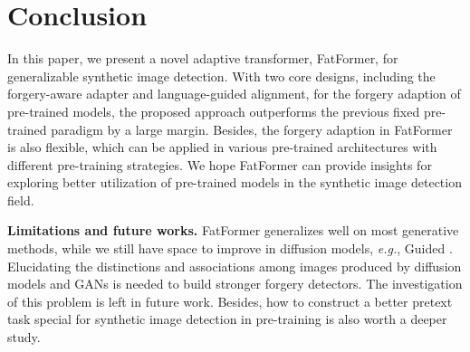 \documentclass[10pt,twocolumn,letterpaper]{article}
\begin{document}
\section{Conclusion}
In this paper, we present a novel adaptive transformer, FatFormer, for generalizable synthetic image detection. With two core designs, including the forgery-aware adapter and language-guided alignment, for the forgery adaption of pre-trained models, the proposed approach outperforms the previous fixed pre-trained paradigm by a large margin. Besides, the forgery adaption in FatFormer is also flexible, which can be applied in various pre-trained architectures with different pre-training strategies. We hope FatFormer can provide insights for exploring better utilization of pre-trained models in the synthetic image detection field.

\noindent \textbf{Limitations and future works.} 
FatFormer generalizes well on most generative methods, while we still have space to improve in diffusion models, {\em e.g.}, Guided \cite{dhariwal2021diffusion}. 
Elucidating the distinctions and associations among images produced by diffusion models and GANs is needed to build stronger forgery detectors.
The investigation of this problem is left in future work. 
Besides, how to construct a better pretext task special for synthetic image detection in pre-training is also worth a deeper study.

{
    \small
    
    
}
\end{document}
